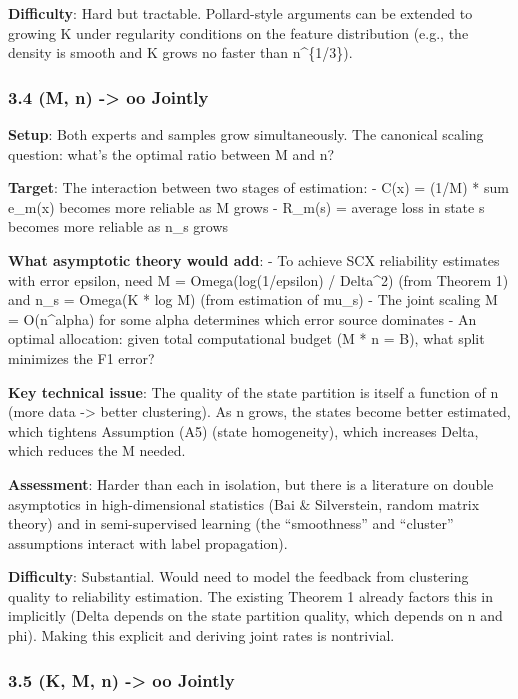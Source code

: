 \documentclass[
  12pt,
]{ctexart}
\begin{document}
\textbf{Difficulty}: Hard but tractable. Pollard-style arguments can be
extended to growing K under regularity conditions on the feature
distribution (e.g., the density is smooth and K grows no faster than
n\^{}\{1/3\}).

\subsubsection{3.4 (M, n) -\textgreater{} oo
Jointly}\label{m-n---oo-jointly}

\textbf{Setup}: Both experts and samples grow simultaneously. The
canonical scaling question: what's the optimal ratio between M and n?

\textbf{Target}: The interaction between two stages of estimation: -
C(x) = (1/M) * sum e\_m(x) becomes more reliable as M grows - R\_m(s) =
average loss in state s becomes more reliable as n\_s grows

\textbf{What asymptotic theory would add}: - To achieve SCX reliability
estimates with error epsilon, need M = Omega(log(1/epsilon) /
Delta\^{}2) (from Theorem 1) and n\_s = Omega(K * log M) (from
estimation of mu\_s) - The joint scaling M = O(n\^{}alpha) for some
alpha determines which error source dominates - An optimal allocation:
given total computational budget (M * n = B), what split minimizes the
F1 error?

\textbf{Key technical issue}: The quality of the state partition is
itself a function of n (more data -\textgreater{} better clustering). As
n grows, the states become better estimated, which tightens Assumption
(A5) (state homogeneity), which increases Delta, which reduces the M
needed.

\textbf{Assessment}: Harder than each in isolation, but there is a
literature on double asymptotics in high-dimensional statistics (Bai \&
Silverstein, random matrix theory) and in semi-supervised learning (the
``smoothness'' and ``cluster'' assumptions interact with label
propagation).

\textbf{Difficulty}: Substantial. Would need to model the feedback from
clustering quality to reliability estimation. The existing Theorem 1
already factors this in implicitly (Delta depends on the state partition
quality, which depends on n and phi). Making this explicit and deriving
joint rates is nontrivial.

\subsubsection{3.5 (K, M, n) -\textgreater{} oo
Jointly}\label{k-m-n---oo-jointly}
\end{document}
